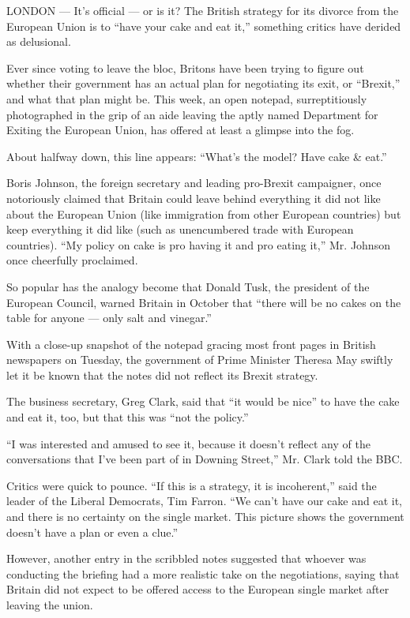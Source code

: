 LONDON --- It's official --- or is it? The British strategy for its
divorce from the European Union is to ``have your cake and eat it,''
something critics have derided as delusional.

Ever since voting to leave the bloc, Britons have been trying to figure
out whether their government has an actual plan for negotiating its
exit, or ``Brexit,'' and what that plan might be. This week, an open
notepad, surreptitiously photographed in the grip of an aide leaving the
aptly named Department for Exiting the European Union, has offered at
least a glimpse into the fog.

About halfway down, this line appears: ``What's the model? Have cake \&
eat.''

Boris Johnson, the foreign secretary and leading pro-Brexit campaigner,
once notoriously claimed that Britain could leave behind everything it
did not like about the European Union (like immigration from other
European countries) but keep everything it did like (such as
unencumbered trade with European countries). ``My policy on cake is pro
having it and pro eating it,'' Mr. Johnson once cheerfully proclaimed.

So popular has the analogy become that Donald Tusk, the president of the
European Council, warned Britain in October that ``there will be no
cakes on the table for anyone --- only salt and vinegar.''

With a close-up snapshot of the notepad gracing most front pages in
British newspapers on Tuesday, the government of Prime Minister Theresa
May swiftly let it be known that the notes did not reflect its Brexit
strategy.

The business secretary, Greg Clark, said that ``it would be nice'' to
have the cake and eat it, too, but that this was ``not the policy.''

``I was interested and amused to see it, because it doesn't reflect any
of the conversations that I've been part of in Downing Street,'' Mr.
Clark told the BBC.

Critics were quick to pounce. ``If this is a strategy, it is
incoherent,'' said the leader of the Liberal Democrats, Tim Farron. ``We
can't have our cake and eat it, and there is no certainty on the single
market. This picture shows the government doesn't have a plan or even a
clue.''

However, another entry in the scribbled notes suggested that whoever was
conducting the briefing had a more realistic take on the negotiations,
saying that Britain did not expect to be offered access to the European
single market after leaving the union.

